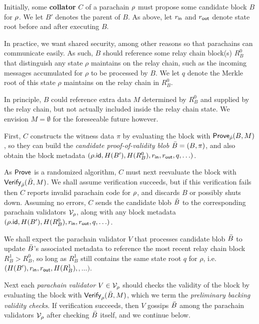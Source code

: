 Initially, some {\bf collator} $C$ of a parachain $\rho$ must propose some candidate block $B$ for $\rho$.  We let $B'$ denotes the parent of $B$.  As above, let $r_{\mathsf{in}}$ and $r_{\mathsf{out}}$ denote state root before and after executing $B$.  

In practice, we want shared security, among other reasons so that parachains can communicate easily.  As such, $B$ should reference some relay chain block(s) $R^0_B$ that distinguish any state $\rho$ maintains on the relay chain, such as the incoming messages accumulated for $\rho$ to be processed by $B$.  We let $q$ denote the Merkle root of this state $\rho$ maintains on the relay chain in $R^0_B$.  

In principle, $B$ could reference extra data $M$ determined by $R^0_B$ and supplied by the relay chain, but not actually included inside the relay chain state.  We envision $M = \emptyset$ for the foreseeable future however. 

First, $C$ constructs the witness data $\pi$ by evaluating the block with $\mathsf{Prove}_{\hat{\rho}}(B,M)$, so they can build the {\em candidate proof-of-validity blob} $\bar{B} = (B,\pi)$, and also obtain the block metadata $(\rho.\mathsf{id},H(B'),H(R^0_B),r_{\mathsf{in}},r_{\mathsf{out}},q,\ldots)$.

As $\mathsf{Prove}$ is a randomized algorithm, $C$ must next reevaluate the block with $\mathsf{Verify}_{\hat{\rho}}(\bar{B},M)$.  We shall assume verification succeeds, but if this verification fails then $C$ reports invalid parachain code for $\rho$, and discards $B$ or possibly shuts down.  Assuming no errors, $C$ sends the candidate blob $\bar{B}$ to the corresponding parachain validators $\mathcal{V}_{\rho}$, along with any block metadata $(\rho.\mathsf{id},H(B'),H(R^0_B),r_{\mathsf{in}},r_{\mathsf{out}},q,\ldots)$. 

\smallskip

We shall expect the parachain validator $V$ that processes candidate blob $\bar{B}$ to update $\bar{B}$'s associated metadata to reference the most recent relay chain block $R^1_B > R^0_B$, so long as $R^1_B$ still contains the same state root $q$ for $\rho$,
i.e.\ $(H(B'),r_{\mathsf{in}},r_{\mathsf{out}},H(R^1_B),$$,\ldots)$.

Next each {\em parachain validator} $V \in \mathcal{V}_{\rho}$ should checks the validity of the block by evaluating the block with $\mathsf{Verify}_{\rho}(\bar{B},M)$, which we term the {\em preliminary backing validity checks}.  If verification succeeds, then $V$ gossips $\bar{B}$ among the parachain validators $\mathcal{V}_{\rho}$ after checking $\bar{B}$ itself, and we continue below.

